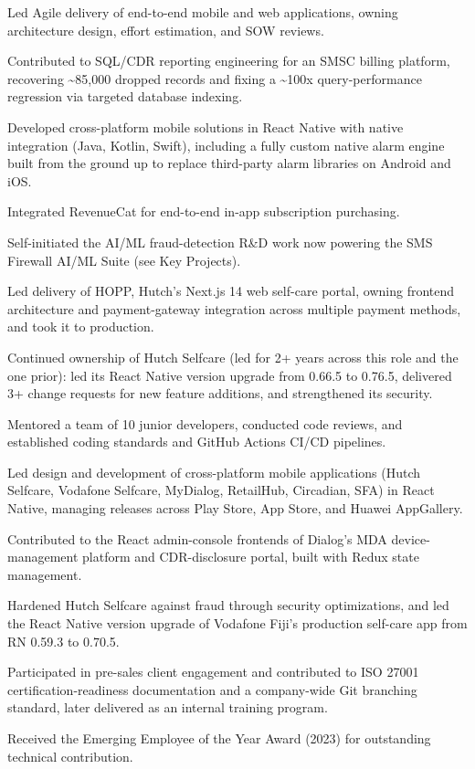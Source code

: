 \documentclass[10.5pt]{article}
\begin{document}
\begin{cvitems}
  \item Led Agile delivery of end-to-end mobile and web applications, owning architecture design, effort estimation, and SOW reviews.
  \item Contributed to SQL/CDR reporting engineering for an SMSC billing platform, recovering \textasciitilde85,000 dropped records and fixing a \textasciitilde100x query-performance regression via targeted database indexing.
  \item Developed cross-platform mobile solutions in React Native with native integration (Java, Kotlin, Swift), including a fully custom native alarm engine built from the ground up to replace third-party alarm libraries on Android and iOS.
  \item Integrated RevenueCat for end-to-end in-app subscription purchasing.
  \item Self-initiated the AI/ML fraud-detection R\&D work now powering the SMS Firewall AI/ML Suite (see Key Projects).
  \item Led delivery of HOPP, Hutch's Next.js 14 web self-care portal, owning frontend architecture and payment-gateway integration across multiple payment methods, and took it to production.
  \item Continued ownership of Hutch Selfcare (led for 2+ years across this role and the one prior): led its React Native version upgrade from 0.66.5 to 0.76.5, delivered 3+ change requests for new feature additions, and strengthened its security.
  \item Mentored a team of 10 junior developers, conducted code reviews, and established coding standards and GitHub Actions CI/CD pipelines.
\end{cvitems}

\begin{cvitems}
  \item Led design and development of cross-platform mobile applications (Hutch Selfcare, Vodafone Selfcare, MyDialog, RetailHub, Circadian, SFA) in React Native, managing releases across Play Store, App Store, and Huawei AppGallery.
  \item Contributed to the React admin-console frontends of Dialog's MDA device-management platform and CDR-disclosure portal, built with Redux state management.
  \item Hardened Hutch Selfcare against fraud through security optimizations, and led the React Native version upgrade of Vodafone Fiji's production self-care app from RN 0.59.3 to 0.70.5.
  \item Participated in pre-sales client engagement and contributed to ISO 27001 certification-readiness documentation and a company-wide Git branching standard, later delivered as an internal training program.
  \item Received the Emerging Employee of the Year Award (2023) for outstanding technical contribution.
\end{cvitems}
\end{document}
